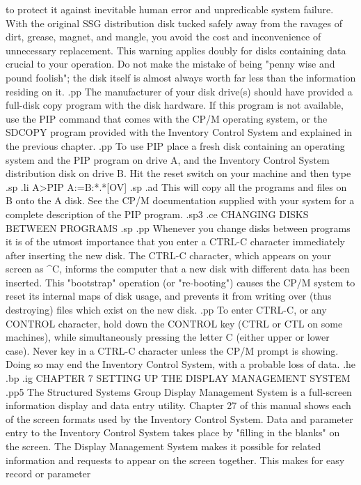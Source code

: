 to protect it against inevitable human error and unpredicable system failure.
With the original SSG distribution disk tucked safely away from the ravages of
dirt, grease, magnet, and mangle, you avoid the cost and inconvenience of
unnecessary replacement.  This warning applies doubly for disks
containing data crucial
to your operation.  Do not make the mistake of being "penny wise and pound
foolish"; the disk itself is almost always worth far less than the information
residing on it.
.pp
The manufacturer of your disk drive(s) should have provided a full-disk copy
program with the disk hardware.  If this program is not available, use the
PIP command that comes with the CP/M operating system, or the SDCOPY program
provided with the Inventory Control System and explained in the previous
chapter.
.pp
To use	PIP
place a fresh disk containing an operating system and the PIP program on
drive A, and the Inventory Control System
distribution disk on drive B.  Hit the reset
switch on your machine and then type
.sp
.li
	A>PIP A:=B:*.*[OV]
.sp
.ad
This will copy all the programs and files on B onto the A disk.
See the CP/M documentation supplied with
your system for a complete description of the PIP program.
.sp3
.ce
CHANGING DISKS BETWEEN PROGRAMS
.sp
.pp
Whenever  you change disks between programs it is of the utmost importance
that you enter a CTRL-C character immediately after inserting the new disk.
The
CTRL-C character, which appears on your screen as ^C, informs the computer
that a new disk with different data has been inserted.	This "bootstrap"
operation (or "re-booting") causes the CP/M system to reset its internal
maps of disk usage, and prevents it from writing over (thus destroying)
files which exist on the new disk.
.pp
To enter CTRL-C, or any CONTROL character, hold down the CONTROL key (CTRL
or CTL on some machines), while simultaneously pressing the letter C
(either upper or lower case).
Never key in a CTRL-C character unless the CP/M prompt is showing.  Doing
so may end the Inventory Control System, with
a probable loss of data.
.he
.bp
.ig
CHAPTER 7
SETTING UP THE DISPLAY MANAGEMENT SYSTEM
.pp5
The Structured Systems Group Display Management System is a full-screen
information display and data entry utility.
Chapter 27 of this manual shows each of the screen formats used by
the Inventory Control System.  Data and parameter entry  to the Inventory
Control System takes place by "filling in the blanks" on the screen.
The Display Management System
makes it possible for related information and requests to
appear on the screen together.	This makes for easy record or parameter
